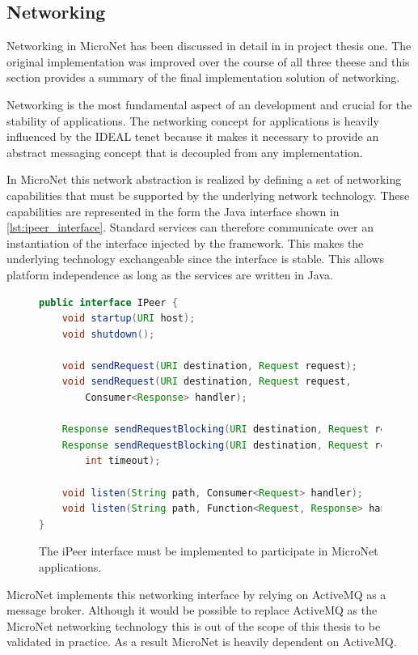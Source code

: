 \subsection{Networking}
\label{sub:networking}
Networking in MicroNet has been discussed in detail in  in project thesis one. The original implementation was
improved over the course of all three theese and this section provides a summary
of the final implementation solution of networking.

Networking is the most fundamental aspect of an \og{} development and crucial
for the stability of \ms{} applications. The networking concept for \ms{}
applications is heavily influenced by the IDEAL tenet because it makes it
necessary to provide an abstract messaging concept that is decoupled from any
implementation.

In MicroNet this network abstraction is realized by defining a set of networking
capabilities that must be supported by the underlying network technology. These
capabilities are represented in the form the  Java interface shown
in \autoref{lst:ipeer_interface}. Standard services can therefore communicate
over an instantiation of the  interface injected by the framework.
This makes the underlying technology exchangeable since the interface is stable.
This allows platform independence as long as the services are written in Java.

\begin{figure}
	\begin{lstlisting}[language=Java,firstnumber=1] 
public interface IPeer {
	void startup(URI host);
	void shutdown();
	
	void sendRequest(URI destination, Request request);
	void sendRequest(URI destination, Request request, 
		Consumer<Response> handler);
		
	Response sendRequestBlocking(URI destination, Request request);
	Response sendRequestBlocking(URI destination, Request request,
		int timeout);
		
	void listen(String path, Consumer<Request> handler);
	void listen(String path, Function<Request, Response> handler);
}
	\end{lstlisting}
  	\caption{The iPeer interface must be implemented to participate in MicroNet
  	applications.}
  	\label{lst:ipeer_interface}
\end{figure}

MicroNet implements this networking interface by relying on ActiveMQ as a
message broker. Although it would be possible to replace ActiveMQ as the
MicroNet networking technology this is out of the scope of this thesis to be
validated in practice. As a result MicroNet is heavily dependent on ActiveMQ.


